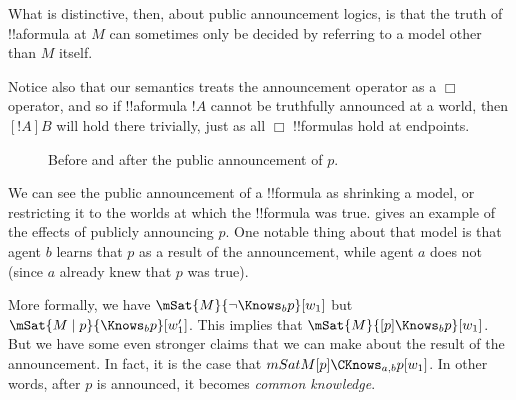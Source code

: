 \documentclass[../../../include/open-logic-section]{subfiles}
\begin{document}
What is distinctive, then, about public announcement logics, is that the truth of !!a{formula} at $M$
can sometimes only be decided by referring to a model other than $M$ itself.

Notice also that our semantics treats the announcement operator as a $\Box$ operator, and so
if !!a{formula} $!A$ cannot be truthfully announced at a world, then $[!A]B$ will hold there trivially,
just as all $\Box$ !!{formula}s hold at endpoints. 

\begin{figure}
  \begin{center}
  \end{center}
  \caption{Before and after the public announcement of $p$.}
\end{figure}

We can see the public announcement of a !!{formula} as shrinking a model, or restricting
it to the worlds at which the !!{formula} was true.  gives an
example of the effects of publicly announcing $p$. One notable thing about that model is that
agent $b$ learns that $p$ as a result of the announcement, while agent $a$ does not (since $a$
already knew that $p$ was true).

More formally, we have $\mSat{M}{\lnot \Knows_b p}[w_1]$ but $\mSat{M \mid p}{\Knows_b p}[w'_1]$. 
This implies that $\mSat{M}{[p] \Knows_b p}[w_1]$. But we have some even stronger claims that we 
can make about the result of the announcement. In fact, it is the case that $mSat{M}{[p]\CKnows_{a,b} p}[w_1]$.
In other words, after $p$ is announced, it becomes \emph{common knowledge}.
\end{document}
